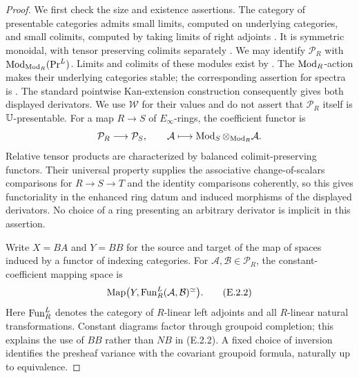 \begin{proof}
We first check the size and existence assertions.  The category of
presentable categories admits small limits, computed on underlying
categories, and small colimits, computed by taking limits of right
adjoints \citep[Proposition 5.5.3.13 and Theorem 5.5.3.18]{EF_LurieHTT}.
It is symmetric monoidal, with tensor preserving colimits separately
\citep[Proposition 4.8.1.15 and Remark 4.8.1.24]{EF_LurieHA}.
We may identify $\mathcal P_R$ with
$\operatorname{Mod}_{\operatorname{Mod}_R}(\operatorname{Pr}^{L})$.  Limits and colimits of these
modules exist by \citet[Corollaries 4.2.3.3 and 4.2.3.5]{EF_LurieHA}.
The $\operatorname{Mod}_R$-action makes their underlying categories stable; the
corresponding assertion for spectra is
\citet[Proposition 4.8.2.18]{EF_LurieHA}.
The standard pointwise Kan-extension construction consequently gives
both displayed derivators.  We use $\mathcal W$ for their values and do
not assert that $\mathcal P_R$ itself is $\mathbb U$-presentable.
For a map $R\to S$ of $E_\infty$-rings, the coefficient functor is
\[
 \mathcal P_R\longrightarrow\mathcal P_S,
 \qquad \mathcal A\longmapsto
              \operatorname{Mod}_S\otimes_{\operatorname{Mod}_R}\mathcal A.
\]
Relative tensor products are characterized by balanced
colimit-preserving functors.  Their universal property supplies the
associative change-of-scalars comparisons for $R\to S\to T$ and
the identity comparisons coherently, so this gives functoriality in
the enhanced ring datum and induced morphisms of the displayed
derivators.  No choice of a ring presenting an arbitrary derivator
is implicit in this assertion.

Write $X=BA$ and $Y=BB$ for the source and target of the map of spaces
induced by a functor of indexing categories.  For $\mathcal A,\mathcal
B\in\mathcal P_R$, the constant-coefficient mapping space is
\[
 \operatorname{Map}\bigl(Y,\operatorname{Fun}_R^L(\mathcal A,\mathcal B)^{\simeq}\bigr).
                                                               \tag{E.2.2}
\]
Here $\operatorname{Fun}_R^L$ denotes the category of $R$-linear left adjoints and all
$R$-linear natural transformations.  Constant diagrams factor through
groupoid completion; this explains the use of $BB$ rather than $NB$ in
(E.2.2).  A fixed choice of inversion identifies the presheaf variance
with the covariant groupoid formula, naturally up to equivalence.


\end{proof}

